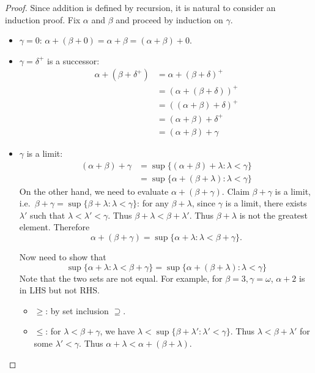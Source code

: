 \documentclass[a4paper]{article}
\begin{document}
\begin{proof}
  Since addition is defined by recursion, it is natural to consider an induction proof. Fix \(\alpha\) and \(\beta\) and proceed by induction on \(\gamma\).
  \begin{itemize}
  \item \(\gamma = 0\): \(\alpha + (\beta + 0) = \alpha + \beta = (\alpha + \beta) + 0\).
  \item \(\gamma = \delta^+\) is a successor:
    \begin{align*}
      \alpha + (\beta + \delta^+)
      &= \alpha + (\beta + \delta)^+ \\
      &= (\alpha + (\beta + \delta))^+ \\
      &= ((\alpha + \beta) + \delta)^+ \\
      &= (\alpha + \beta) + \delta^+ \\
      &= (\alpha + \beta) + \gamma
    \end{align*}
  \item \(\gamma\) is a limit:
    \begin{align*}
      (\alpha + \beta) + \gamma
      &= \sup \{(\alpha + \beta) + \lambda: \lambda < \gamma\} \\
      &= \sup \{\alpha + (\beta + \lambda): \lambda < \gamma\}
    \end{align*}
    On the other hand, we need to evaluate \(\alpha + (\beta + \gamma)\). Claim \(\beta + \gamma\) is a limit, i.e.\ \(\beta + \gamma = \sup \{\beta + \lambda: \lambda < \gamma\}\): for any \(\beta + \lambda\), since \(\gamma\) is a limit, there exists \(\lambda'\) such that \(\lambda < \lambda' < \gamma\). Thus \(\beta + \lambda < \beta + \lambda'\). Thus \(\beta + \lambda\) is not the greatest element. Therefore
    \[
      \alpha + (\beta + \gamma) = \sup \{\alpha + \lambda: \lambda < \beta + \gamma\}.
    \]

    Now need to show that
    \[
      \sup \{\alpha + \lambda: \lambda < \beta + \gamma\} = \sup \{\alpha + (\beta + \lambda): \lambda < \gamma\} 
    \]
    Note that the two sets are not equal. For example, for \(\beta = 3, \gamma = \omega\), \(\alpha + 2\) is in LHS but not RHS.
    \begin{itemize}
    \item \(\geq\): by set inclusion \(\supseteq\).
    \item \(\leq\): for \(\lambda < \beta + \gamma\), we have \(\lambda < \sup \{\beta + \lambda': \lambda' < \gamma\}\). Thus \(\lambda < \beta + \lambda'\) for some \(\lambda' < \gamma\). Thus \(\alpha + \lambda < \alpha + (\beta + \lambda)\).
    \end{itemize}
  \end{itemize}
\end{proof}
\end{document}

